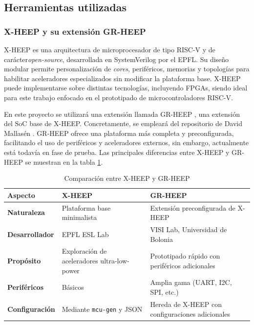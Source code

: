 \subsection{Herramientas utilizadas}

\subsubsection{X-HEEP y su extensión GR-HEEP}
\label{st:xheep}
\ac{X-HEEP} \cite{machetti2024xheep} \cite{xheepInfo} es una arquitectura de microprocesador de tipo RISC-V y de carácter\textit{open-source}, desarrollada en SystemVerilog por el \ac{EPFL}. Su diseño modular permite personalización de \textit{cores}, periféricos, memorias y topologías para habilitar aceleradores especializados sin modificar la plataforma base. X-HEEP puede implementarse sobre distintas tecnologías, incluyendo FPGAs, siendo ideal para este trabajo enfocado en el prototipado de microcontroladores RISC-V.

En este proyecto se utilizará una extensión llamada \ac{GR-HEEP} \cite{grheepInfo}, una extensión del \acf{SoC} base de X-HEEP. Concretamente, se empleará del repositorio de David Mallasén \cite{grHeepRepo}. GR-HEEP ofrece una plataforma más completa y preconfigurada, facilitando el uso de periféricos y aceleradores externos, sin embargo, actualmente está todavía en fase de prueba. Las principales diferencias entre X-HEEP y GR-HEEP se muestran en la tabla \ref{tbl:difsXheepGrheep}.

\begin{table}[h]
\centering
\begin{tabular}{|l|p{7cm}|p{6cm}|} \\
\hline
\textbf{Aspecto} & \textbf{X-HEEP} & \textbf{GR-HEEP} \\
\hline
\textbf{Naturaleza} & Plataforma base minimalista & Extensión preconfigurada de X-HEEP \\
\hline
\textbf{Desarrollador} & EPFL ESL Lab & VISI Lab, Universidad de Bolonia \\
\hline
\textbf{Propósito} & Exploración de aceleradores ultra-low-power & Prototipado rápido con periféricos adicionales \\
\hline
\textbf{Periféricos} & Básicos & Amplia gama (UART, I2C, SPI, etc.) \\
\hline
\textbf{Configuración} & Mediante \texttt{mcu-gen} y JSON & Hereda de X-HEEP con configuraciones adicionales \\
\hline
\end{tabular}
\caption{Comparación entre X-HEEP y GR-HEEP}
\label{tbl:difsXheepGrheep}
\end{table}

